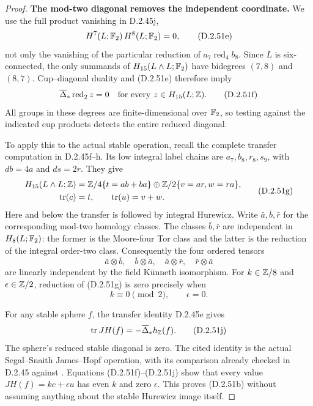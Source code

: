 \begin{proof}
\textbf{The mod-two diagonal removes the independent coordinate.}
We use the full product vanishing in D.2.45j,
\[
                 H^7(L;\mathbb F_2)\,H^8(L;\mathbb F_2)=0,
                 \tag{D.2.51e}
\]
not only the vanishing of the particular reduction of
$a_7\operatorname{red}_4b_8$.  Since $L$ is six-connected,
the only summands of $H_{15}(L\wedge L;\mathbb F_2)$ have
bidegrees $(7,8)$ and $(8,7)$.  Cup--diagonal duality and
\textup{(D.2.51e)} therefore imply
\[
 \overline\Delta_*\operatorname{red}_2z=0
             \quad\text{for every }z\in H_{15}(L;\mathbb Z).
 \tag{D.2.51f}
\]
All groups in these degrees are finite-dimensional over
$\mathbb F_2$, so testing against the indicated cup products
detects the entire reduced diagonal.

To apply this to the actual stable operation, recall the
complete transfer computation in D.2.45f--h.  Its low
integral label chains are $a_7,b_8,r_8,s_9$, with
$db=4a$ and $ds=2r$.  They give
\[
 \begin{aligned}
 H_{15}(L\wedge L;\mathbb Z)
   &=\mathbb Z/4\{t=ab+ba\}\oplus\mathbb Z/2\{v=ar,w=ra\},\\
 \operatorname{tr}(c)&=t,\qquad
 \operatorname{tr}(u)=v+w.
 \end{aligned}
 \tag{D.2.51g}
\]
Here and below the transfer is followed by integral
Hurewicz.  Write $\bar a,\bar b,\bar r$ for the corresponding
mod-two homology classes.  The classes $\bar b,\bar r$
are independent in $H_8(L;\mathbb F_2)$: the former is the
Moore-four Tor class and the latter is the reduction of
the integral order-two class.  Consequently the four
ordered tensors
\[
 \bar a\otimes\bar b,\quad \bar b\otimes\bar a,
 \quad \bar a\otimes\bar r,\quad\bar r\otimes\bar a
 \tag{D.2.51h}
\]
are linearly independent by the field K\"unneth isomorphism.
For $k\in\mathbb Z/8$ and $\epsilon\in\mathbb Z/2$, reduction of
\textup{(D.2.51g)} is zero precisely when
\[
             k\equiv0\pmod2,\qquad\epsilon=0.
             \tag{D.2.51i}
\]

For any stable sphere $f$, the transfer identity D.2.45e
gives
\[
       \operatorname{tr}JH(f)=-\overline\Delta_*h_{\mathbb Z}(f).
       \tag{D.2.51j}
\]
The sphere's reduced stable diagonal is zero.  The cited
identity is the actual Segal--Snaith James--Hopf operation,
with its comparison already checked in D.2.45 against
\cite[Theorems A(iii) and B]{Klein2026Hopf}.
Equations \textup{(D.2.51f)--(D.2.51j)} show that every
value $JH(f)=kc+\epsilon u$ has even $k$ and zero
$\epsilon$.  This proves \textup{(D.2.51b)} without
assuming anything about the stable Hurewicz image itself.


\end{proof}
